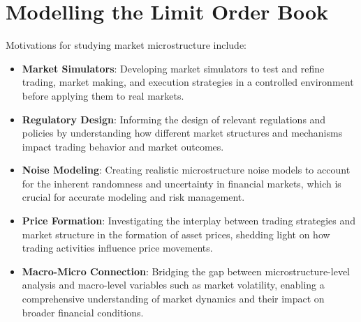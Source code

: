 \chapter{Modelling the Limit Order Book}
\label{modeling_limit_order_book}
Motivations for studying market microstructure include:
\begin{itemize}
\item \textbf{Market Simulators}: Developing market simulators to test and refine trading, market making, and execution strategies in a controlled environment before applying them to real markets.
\item \textbf{Regulatory Design}: Informing the design of relevant regulations and policies by understanding how different market structures and mechanisms impact trading behavior and market outcomes.
\item \textbf{Noise Modeling}: Creating realistic microstructure noise models to account for the inherent randomness and uncertainty in financial markets, which is crucial for accurate modeling and risk management.
\item \textbf{Price Formation}: Investigating the interplay between trading strategies and market structure in the formation of asset prices, shedding light on how trading activities influence price movements.
\item \textbf{Macro-Micro Connection}: Bridging the gap between microstructure-level analysis and macro-level variables such as market volatility, enabling a comprehensive understanding of market dynamics and their impact on broader financial conditions.
\end{itemize}
